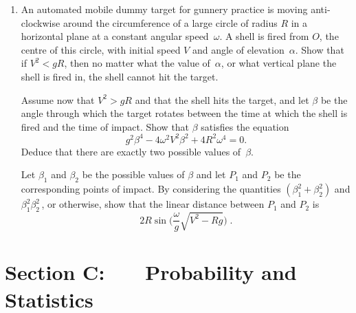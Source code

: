 \documentclass[a4, 11pt]{report}
\newlength{\qspace}
\newcounter{qnumber}
\newenvironment{question}%
 {\vspace{\qspace}
  \begin{enumerate}[\bfseries 1\quad][10]%
    \setcounter{enumi}{\value{qnumber}}%
    \item%
 }
{
  \end{enumerate}
  \filbreak
  \stepcounter{qnumber}
 }
\begin{document}

\begin{question}
An automated mobile dummy target for gunnery practice
is moving anti-clockwise around the circumference of a large circle
of radius $R$ in a horizontal plane at a constant angular speed~$\omega$.  
A shell is fired from $O$, the centre of this circle, with
initial speed $V$ and angle of elevation~$\alpha$.  
Show that if 
$V^2<gR$, then no matter what the value of~$\alpha$, or what 
vertical plane the shell is fired in, the shell cannot hit the target.

Assume now that $V^2>gR$ and that the shell hits the target, and let 
$\beta$ be the angle through which the target rotates between the 
time at which the  shell is fired and the time  of impact. Show that
$\beta$ satisfies the   equation
$$
g^2{{\beta}^4} - 4{{\omega}^2}{V^2}{{\beta}^2}
+4{R^2}{{\omega}^4}=0.
$$
Deduce that  there are exactly two possible 
values of~$\beta$.

Let $\beta_1$ and $\beta_2$ be the possible values of $\beta$
and let $P_1$ and $P_2$ be the corresponding points of impact.
By considering the quantities $(\beta_1^2 +\beta_2^2) $
and $\beta_1^2\beta_2^2\,$, or otherwise, 
show that the linear distance between $P_1$ and $P_2$ is
\[
2R \sin\Big( \frac\omega g \sqrt{V^2-Rg}\Big) 
\;.
\] 
\end{question}
	

	
	\newpage
\section*{Section C: \ \ \ Probability and Statistics}
\end{document}
